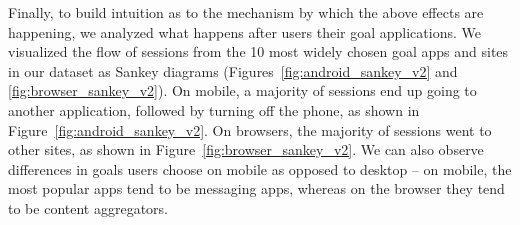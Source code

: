 Finally, to build intuition as to the mechanism by which the above effects are happening, we analyzed what happens after users their goal applications. We visualized the flow of sessions from the 10 most widely chosen goal apps and sites in our dataset as Sankey diagrams (Figures~\ref{fig:android_sankey_v2} and \ref{fig:browser_sankey_v2}). On mobile, a majority of sessions end up going to another application, followed by turning off the phone, as shown in Figure~\ref{fig:android_sankey_v2}. On browsers, the majority of sessions went to other sites, as shown in Figure~\ref{fig:browser_sankey_v2}. We can also observe differences in goals users choose on mobile as opposed to desktop -- on mobile, the most popular apps tend to be messaging apps, whereas on the browser they tend to be content aggregators. %

